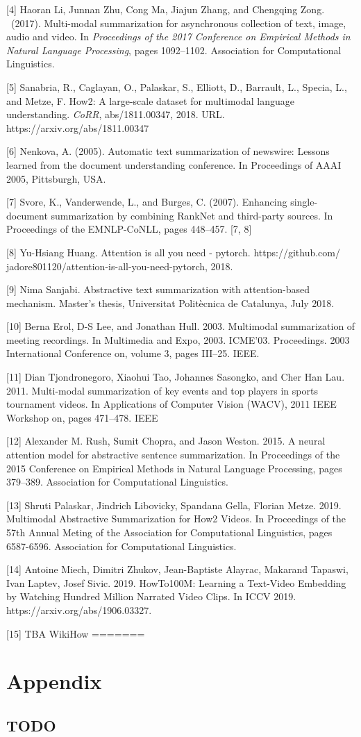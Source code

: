\documentclass{article}
\begin{document}
[4] Haoran Li, Junnan Zhu, Cong Ma, Jiajun Zhang, and Chengqing Zong. \ (2017). Multi-modal summarization for
asynchronous collection of text, image, audio and video. In {\it Proceedings of the 2017 Conference on Empirical
Methods in Natural Language Processing}, pages 1092–1102. Association for Computational Linguistics.

[5] Sanabria, R., Caglayan, O., Palaskar, S., Elliott, D., Barrault, L., Specia, L., and Metze, F. How2: A large-scale dataset for multimodal language understanding. {\it CoRR}, abs/1811.00347, 2018. URL. https://arxiv.org/abs/1811.00347

[6] Nenkova, A. (2005). Automatic text summarization of newswire: Lessons learned from the document understanding conference. In Proceedings of AAAI 2005, Pittsburgh, USA.

[7] Svore, K., Vanderwende, L., and Burges, C. (2007). Enhancing single-document summarization by combining RankNet and third-party sources. In Proceedings of the EMNLP-CoNLL, pages 448–457. [7, 8] 

[8] Yu-Hsiang Huang. Attention is all you need - pytorch. https://github.com/ jadore801120/attention-is-all-you-need-pytorch, 2018.

[9] Nima Sanjabi. Abstractive text summarization with attention-based mechanism. Master’s thesis, Universitat Politècnica de Catalunya, July 2018.

[10] Berna Erol, D-S Lee, and Jonathan Hull. 2003. Multimodal summarization of meeting recordings. In Multimedia and Expo, 2003. ICME’03. Proceedings. 2003 International Conference on, volume 3, pages III–25. IEEE.

[11] Dian Tjondronegoro, Xiaohui Tao, Johannes Sasongko, and Cher Han Lau. 2011. Multi-modal summarization of key events and top players in sports tournament videos. In Applications of Computer Vision (WACV), 2011 IEEE Workshop on, pages 471–478. IEEE

[12] Alexander M. Rush, Sumit Chopra, and Jason Weston. 2015. A neural attention model for abstractive sentence summarization. In Proceedings of the 2015 Conference on Empirical Methods in Natural Language Processing, pages 379–389. Association for Computational Linguistics.

[13] Shruti Palaskar, Jindrich Libovicky, Spandana Gella, Florian Metze. 2019. Multimodal Abstractive Summarization for How2 Videos. In Proceedings of the 57th Annual Meting of the Association for Computational Linguistics, pages 6587-6596. Association for Computational Linguistics.

[14] Antoine Miech, Dimitri Zhukov, Jean-Baptiste Alayrac, Makarand Tapaswi, Ivan Laptev, Josef Sivic. 2019. HowTo100M: Learning a Text-Video Embedding by Watching Hundred Million Narrated Video Clips. In ICCV 2019. https://arxiv.org/abs/1906.03327.
 
[15] TBA WikiHow
=======
\section*{Appendix}  

\subsection{TODO}
\end{document}
